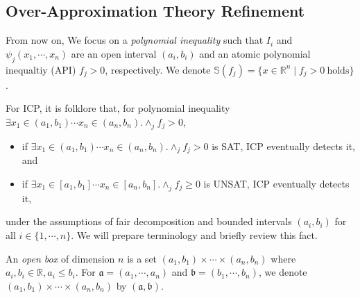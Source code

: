\documentclass[runningheads,a4paper,oribibl]{llncs}
\newcommand{\Real}{{\mathbb R}}
\newcommand{\suppress}[1]{} %
\begin{document}
\subsection{Over-Approximation Theory Refinement}
\label{sec:soundness}

From now on, We focus on a \emph{polynomial inequality} such that 
$I_i$ and $\psi_j(x_1,\cdots,x_n)$ are an open interval $(a_i,b_i)$ and 
an atomic polynomial inequaltiy (API) $f_j > 0$, respectively. 
We denote $\mathbb{S}(f_j) = \{x \in \Real^n \mid f_j > 0 ~\text{holds}\}$.

For ICP, it is folklore that, for polynomial inequality 
$\exists x_1 \in (a_1,b_1) \cdots x_n \in (a_n,b_n) . \wedge_{j} f_j > 0$, 
\begin{itemize}
\item if $\exists x_1 \in (a_1,b_1) \cdots x_n \in (a_n,b_n) . \wedge_{j} f_j > 0$ is SAT, 
ICP eventually detects it, and 
\item if $\exists x_1 \in [a_1,b_1] \cdots x_n \in [a_n,b_n] . \wedge_{j} f_j \geq 0$ is UNSAT, 
ICP eventually detects it, 
\end{itemize}
under the assumptions of fair decomposition and bounded intervals $(a_i,b_i)$ for all $i \in \{1, \cdots, n\}$. 
We will prepare terminology and briefly review this fact. 

\suppress{
\begin{definition} \label{def:poly}
A polynomial inequality is a bounded quantification 
$\exists x_1 \in I_1 \cdots x_n \in I_n. \psi(x_1,\cdots,x_n)$ 
such that 
\begin{itemize}
\item each $I_i$ is an open interval $x_i \in (a_i,b_i)$, and 
\item $\psi(x_1,\cdots,x_n)$ is a conjunction of $f_j > 0$ 
where $f_j$ is a polynomial over $\{x_1, \cdots, x_n\}$. 
\end{itemize}
$f_i > 0$ is called an atomic polynomial inequality (API). 
We denote $\mathbb{S}(F) = \{x \in \Real^n \mid F ~\text{holds}\}$.
\end{definition}

\begin{example} \label{examp:poly_ieq}
$\exists x \in (-1,3)~y \in (2,4) . (x^3y - y^4 > 0) \wedge (y^3 -xy >0)$
is an example of a polynomial inequality with 2 variables and 2 APIs. 
\end{example}
}

\begin{definition}
An \emph{open box} of dimension $n$ is a set $(a_1,b_1) \times \cdots \times (a_n,b_n)$ 
where $a_i, b_i \in \Real, a_i \leq b_i$.  
For $\mathfrak{a} = (a_1, \cdots, a_n)$ and $\mathfrak{b} = (b_1, \cdots, b_n)$, 
we denote $(a_1,b_1) \times \cdots \times (a_n,b_n)$ by $(\mathfrak{a}, \mathfrak{b})$. 
\end{definition}
\end{document}
